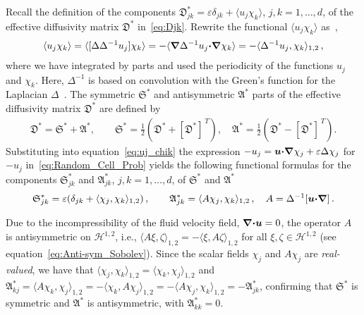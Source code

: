 \documentclass[english,12pt,jmp,graphicx]{revtex4-1}
\newcommand{\vecu}{\boldsymbol{u}}
\newcommand{\bnabla}{\mbox{\boldmath${\nabla}$}}
\newcommand{\bcdot}{\mbox{\boldmath${\cdot}$}}
\newcommand{\Sg}{\mathfrak{S}}
\newcommand{\Ag}{\mathfrak{A}}
\newcommand{\Dg}{\mathfrak{D}}
\newcommand{\Hs}{\mathscr{H}}
\begin{document}
Recall the definition of the components
$\Dg^*_{jk}=\varepsilon\delta_{jk}+\langle u_j\chi_k\rangle$, $j,k=1,\ldots,d$, of the effective
diffusivity matrix $\Dg^*$ 
in~\eqref{eq:Djk}. Rewrite the functional $\langle u_j\chi_k\rangle$
as~\cite{Pavliotis:PHD_Thesis},      
%
\begin{align}\label{eq:uj_chik}
  \langle u_j\chi_k\rangle=\langle[\Delta\Delta^{-1}u_j]\chi_k\rangle
       =-\langle\bnabla \Delta^{-1}u_j\bcdot\bnabla \chi_k\rangle
       =-\langle\Delta^{-1}u_j,\chi_k\rangle_{1,2}\,,
\end{align}
%
where we have integrated by parts and used the periodicity of the
functions $u_j$ and $\chi_k$. Here, $\Delta^{-1}$ is based on
convolution with the Green's function for the Laplacian
$\Delta$~\cite{Stakgold:BVP:2000}.
The symmetric $\Sg^*$ and antisymmetric $\Ag^*$ parts of the
effective diffusivity matrix $\Dg^*$ are defined by 
%
\begin{align}\label{eq:Symm_Anti-Symm}
  \Dg^*=\Sg^*+\Ag^*,\qquad
  \Sg^*=\frac{1}{2}\left(\Dg^*+[\Dg^*]^{\,T}\right), \quad
  \Ag^*=\frac{1}{2}\left(\Dg^*-[\Dg^*]^{\,T}\right).
\end{align}
%
Substituting into equation~\eqref{eq:uj_chik} the expression
$-u_j=\vecu\bcdot\bnabla\chi_j+\varepsilon\Delta\chi_j$ for $-u_j$
in~\eqref{eq:Random_Cell_Prob} yields the following functional 
formulas for the components $\Sg^*_{jk}$ and $\Ag^*_{jk}$,
$j,k=1,\ldots,d$,
of $\Sg^*$ and $\Ag^*$
%
\begin{align}\label{eq:Eff_Diffusivity_Sobolev}
  \Sg^*_{jk}=\varepsilon(\delta_{jk}+\langle\chi_j,\chi_k\rangle_{1,2})\,, \qquad
  \Ag^*_{jk}=\langle A\chi_j,\chi_k\rangle_{1,2}\,, \quad
  A=\Delta^{-1}[\vecu\bcdot\bnabla]\,.
\end{align}
%

Due to the incompressibility of
the fluid velocity field, $\bnabla\bcdot\vecu=0$, the
operator
$A$ is antisymmetric on $\Hs^{1,2}$, i.e., $\langle
A\xi,\zeta\rangle_{1,2}=-\langle \xi,A\zeta\rangle_{1,2}$ for all 
$\xi,\zeta\in\Hs^{1,2}$ (see equation~\eqref{eq:Anti-sym_Sobolev}).
Since the 
scalar fields $\chi_j$ and 
$A\chi_j$ are \emph{real-valued}, we have that $\langle\chi_j,\chi_k\rangle_{1,2}=\langle\chi_k,\chi_j\rangle_{1,2}$ and
$\Ag^*_{kj}=\langle A\chi_k,\chi_j\rangle_{1,2}=-\langle\chi_k,A\chi_j\rangle_{1,2}=-\langle A\chi_j,\chi_k\rangle_{1,2}=-\Ag^*_{jk}$, 
confirming that $\Sg^*$ is symmetric and $\Ag^*$ is antisymmetric,
with $\Ag^*_{kk}=0$. 
\end{document}
